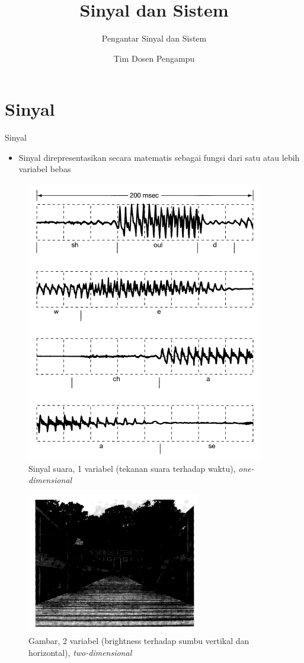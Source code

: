 \documentclass[pdflatex,compress,mathserif]{beamer}
\title{Sinyal dan Sistem}
\subtitle{Pengantar Sinyal dan Sistem}
\author{Tim Dosen Pengampu}
\begin{document}
\maketitle

\section{Sinyal}

\begin{frame}{Sinyal}
	\begin{itemize}
		\item Sinyal direpresentasikan secara matematis sebagai fungsi dari satu atau lebih variabel bebas
	\end{itemize}
	\begin{multicols}{2}
		\begin{figure}
			\includegraphics[width=0.5\linewidth]{img/00.sinyal_suara}
			\caption{Sinyal suara, 1 variabel (tekanan suara terhadap waktu), \textit{one-dimensional}}
		\end{figure}
		\begin{figure}
			\includegraphics[width=0.7\linewidth]{img/00.sinyal_gambar}
			\caption{Gambar, 2 variabel (brightness terhadap sumbu vertikal dan horizontal), \textit{two-dimensional}}
		\end{figure}
	\end{multicols}
\end{frame}
\end{document}
